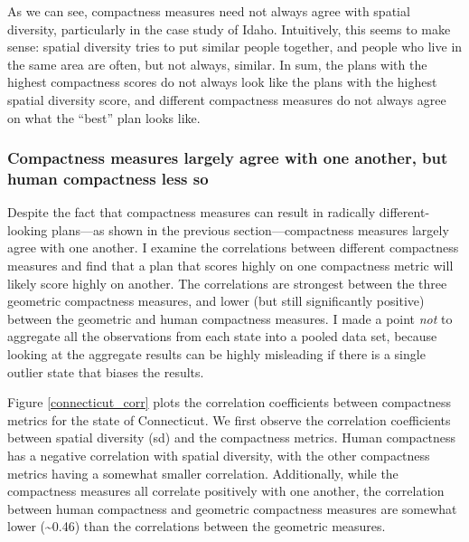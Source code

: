 \documentclass[]{article}
\begin{document}
As we can see, compactness measures need not always agree with spatial
diversity, particularly in the case study of Idaho. Intuitively, this
seems to make sense: spatial diversity tries to put similar people
together, and people who live in the same area are often, but not
always, similar. In sum, the plans with the highest compactness scores
do not always look like the plans with the highest spatial diversity
score, and different compactness measures do not always agree on what
the ``best'' plan looks like.

\hypertarget{compactness-measures-largely-agree-with-one-another-but-human-compactness-less-so}{%
\subsubsection{Compactness measures largely agree with one another, but
human compactness less
so}\label{compactness-measures-largely-agree-with-one-another-but-human-compactness-less-so}}

Despite the fact that compactness measures can result in radically
different-looking plans---as shown in the previous section---compactness
measures largely agree with one another. I examine the correlations
between different compactness measures and find that a plan that scores
highly on one compactness metric will likely score highly on another.
The correlations are strongest between the three geometric compactness
measures, and lower (but still significantly positive) between the
geometric and human compactness measures. I made a point \emph{not} to
aggregate all the observations from each state into a pooled data set,
because looking at the aggregate results can be highly misleading if
there is a single outlier state that biases the results.

Figure \ref{connecticut_corr} plots the correlation coefficients between
compactness metrics for the state of Connecticut. We first observe the
correlation coefficients between spatial diversity (sd) and the
compactness metrics. Human compactness has a negative correlation with
spatial diversity, with the other compactness metrics having a somewhat
smaller correlation. Additionally, while the compactness measures all
correlate positively with one another, the correlation between human
compactness and geometric compactness measures are somewhat lower
(\textasciitilde{}0.46) than the correlations between the geometric
measures.
\end{document}
